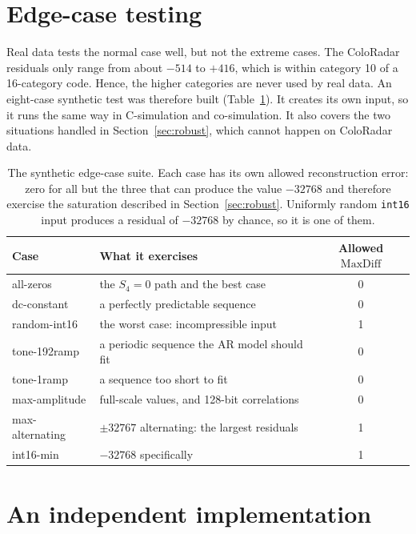 \section{Edge-case testing}
\label{sec:edgecases}

Real data tests the normal case well, but not the extreme cases. The ColoRadar
residuals only range from about $-514$ to $+416$, which is within category 10
of a 16-category code. Hence, the higher categories are never used by real
data. An eight-case synthetic test was therefore built
(Table~\ref{tab:edgecases}). It creates its own input, so it runs the same way
in C-simulation and co-simulation. It also covers the two situations handled in
Section~\ref{sec:robust}, which cannot happen on ColoRadar data.

\begin{table}[t]
\centering
\caption[Synthetic edge cases]{The synthetic edge-case suite. Each case has its
own allowed reconstruction error: zero for all but the three that can produce
the value $-32768$ and therefore exercise the saturation described in
Section~\ref{sec:robust}. Uniformly random \texttt{int16} input produces a
residual of $-32768$ by chance, so it is one of them.}
\label{tab:edgecases}
\small
\begin{tabular}{l|l|c}
\textbf{Case} & \textbf{What it exercises} & \textbf{Allowed $\mathrm{MaxDiff}$} \\
\hline
all-zeros        & the $S_4 = 0$ path and the best case & 0 \\
dc-constant      & a perfectly predictable sequence & 0 \\
random-int16     & the worst case: incompressible input & 1 \\
tone-192ramp     & a periodic sequence the AR model should fit & 0 \\
tone-1ramp       & a sequence too short to fit & 0 \\
max-amplitude    & full-scale values, and 128-bit correlations & 0 \\
max-alternating  & $\pm 32767$ alternating: the largest residuals & 1 \\
int16-min        & $-32768$ specifically & 1 \\
\end{tabular}
\end{table}

\section{An independent implementation}
\label{sec:indep}

